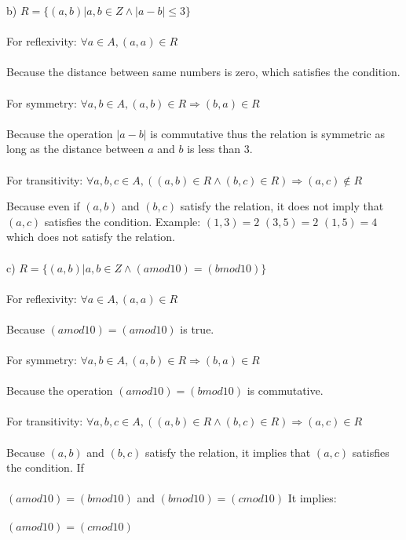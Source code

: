 \documentclass{article}
\begin{document}
    b) $R = \{(a, b) | a, b \in Z \land |a - b| \leq 3 \}$
        \\\\
        For reflexivity:
        $\forall a \in A, (a, a) \in R$
        \\\\
        Because the distance between same numbers is zero, which satisfies the condition.
        \\\\
        For symmetry:
        $\forall a, b \in A, (a, b) \in R \Rightarrow (b, a) \in R$
        \\\\
        Because the operation $|a - b|$ is commutative thus the relation is symmetric as long as the distance between $a$ and $b$ is less than 3.
        \\\\
        For transitivity:
        $\forall a, b, c \in A, ((a, b) \in R \land (b, c) \in R) \Rightarrow (a, c) \notin R $

        Because even if $(a, b)$ and $(b, c)$ satisfy the relation, it does not imply that $(a, c)$ satisfies the condition.
        Example:
        $(1, 3) = 2$
        $(3, 5) = 2$
        $(1, 5) = 4$ which does not satisfy the relation.
        \\\\
    c) $R = \{(a, b) | a, b \in Z \land (a mod 10) = (b mod 10) \}$
        \\\\
        For reflexivity:
        $\forall a \in A, (a, a) \in R$
        \\\\
        Because $(a mod 10) = (a mod 10)$ is true.
        \\\\
        For symmetry:
        $\forall a, b \in A, (a, b) \in R \Rightarrow (b, a) \in R$
        \\\\
        Because the operation $(a mod 10) = (b mod 10)$ is commutative.
        \\\\
        For transitivity:
        $\forall a, b, c \in A, ((a, b) \in R \land (b, c) \in R) \Rightarrow (a, c) \in R $
        \\\\
        Because  $(a, b)$ and $(b, c)$ satisfy the relation, it implies that $(a, c)$ satisfies the condition.
        If \\\\
        $(a mod 10) = (b mod 10)$ and $(b mod 10) = (c mod 10)$
        It implies: \\\\
        $(a mod 10) = (c mod 10)$
        \\\\
        
\end{document}
